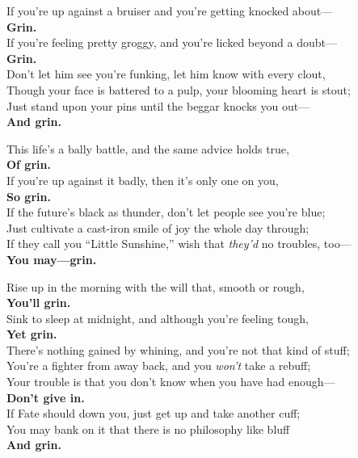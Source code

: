 
\begin{poemblock}
If you're up against a bruiser and you're getting knocked about---\\
\hspace*{18em}\textbf{Grin.}\\
If you're feeling pretty groggy, and you're licked beyond a doubt---\\
\hspace*{18em}\textbf{Grin.}\\
Don't let him see you're funking, let him know with every clout,\\
Though your face is battered to a pulp, your blooming heart is stout;\\
Just stand upon your pins until the beggar knocks you out---\\
\hspace*{18em}\textbf{And grin.}


This life's a bally battle, and the same advice holds true,\\
\hspace*{18em}\textbf{Of grin.}\\
If you're up against it badly, then it's only one on you,\\
\hspace*{18em}\textbf{So grin.}\\
If the future's black as thunder, don't let people see you're blue;\\
Just cultivate a cast-iron smile of joy the whole day through;\\
If they call you ``Little Sunshine,'' wish that \textit{they'd} no troubles, too---\\
\hspace*{18em}\textbf{You may---grin.}


Rise up in the morning with the will that, smooth or rough,\\
\hspace*{18em}\textbf{You'll grin.}\\
Sink to sleep at midnight, and although you're feeling tough,\\
\hspace*{18em}\textbf{Yet grin.}\\
There's nothing gained by whining, and you're not that kind of stuff;\\
You're a fighter from away back, and you \textit{won't} take a rebuff;\\
Your trouble is that you don't know when you have had enough---\\
\hspace*{18em}\textbf{Don't give in.}\\
If Fate should down you, just get up and take another cuff;\\
You may bank on it that there is no philosophy like bluff\\
\hspace*{18em}\textbf{And grin.}
\end{poemblock}